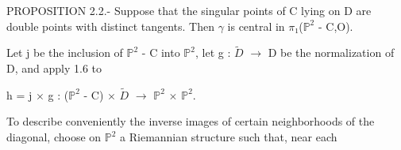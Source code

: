 \documentclass[10pt,a4paper]{article}
\begin{document}
\begin{adjustbox}{max totalsize={\textwidth}{0.945\textheight},center}
\begin{minipage}{\textwidth}
\noindent PROPOSITION 2.2.- Suppose that the singular points of C lying on D are double points with distinct tangents. Then \ensuremath{γ} is central in \ensuremath{π₁}(\ensuremath{ℙ^2} - C,O).\par\smallskip
\noindent Let j be the inclusion of \ensuremath{ℙ^2} - C into \ensuremath{ℙ^2}, let g : \ensuremath{\widetilde{D}} \ensuremath{→} D be the normalization of D, and apply 1.6 to\par\smallskip
\noindent h = j \ensuremath{×} g : (\ensuremath{ℙ^2} - C) \ensuremath{×} \ensuremath{\widetilde{D}} \ensuremath{→} \ensuremath{ℙ^2} \ensuremath{×} \ensuremath{ℙ^2}.\par\smallskip
\noindent To describe conveniently the inverse images of certain neighborhoods of the diagonal, choose on \ensuremath{ℙ^2} a Riemannian structure such that, near each\par\smallskip
\end{minipage}
\end{adjustbox}
\newpage
\end{document}
